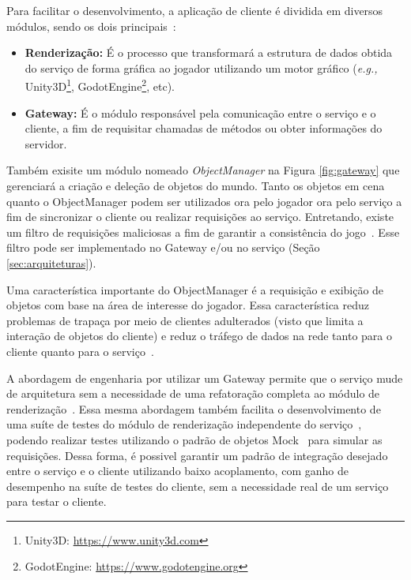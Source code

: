 Para facilitar o desenvolvimento, a aplicação de cliente é dividida em diversos módulos, sendo os dois principais~\cite{albion_online_unite}:



\begin{itemize}
  \item \textbf{Renderização:} É o processo que transformará a estrutura de dados obtida do serviço de forma gráfica ao jogador utilizando um motor gráfico (\textit{e.g.,} Unity3D\footnote{Unity3D: \url{https://www.unity3d.com}}, GodotEngine\footnote{GodotEngine: \url{https://www.godotengine.org}}, etc).
  \item \textbf{Gateway:} É o módulo responsável pela comunicação entre o serviço e o cliente, a fim de requisitar chamadas de métodos ou obter informações do servidor.
\end{itemize}



Também exisite um módulo nomeado \textit{ObjectManager} na Figura \ref{fig:gateway} que gerenciará a criação e deleção de objetos do mundo.
%
Tanto os objetos em cena quanto o ObjectManager podem ser utilizados ora pelo jogador ora pelo serviço a fim de sincronizar o cliente ou realizar requisições ao serviço.
%
Entretando, existe um filtro de requisições maliciosas a fim de garantir a consistência do jogo~\cite{albion_online_unite}.
%
Esse filtro pode ser implementado no Gateway e/ou no serviço (Seção \ref{sec:arquiteturas}).



Uma característica importante do ObjectManager é a requisição e exibição de objetos com base na área de interesse do jogador.
%
Essa característica reduz problemas de trapaça por meio de clientes adulterados (visto que limita a interação de objetos do cliente) e reduz o tráfego de dados na rede tanto para o cliente quanto para o serviço~\cite{albion_online_unite, stephenclarkewillson2017}.



A abordagem de engenharia por utilizar um Gateway permite que o serviço mude de arquitetura sem a necessidade de uma refatoração completa ao módulo de renderização~\cite{albion_online_unite, stephenclarkewillson2017}.
%
Essa mesma abordagem também facilita o desenvolvimento de uma suíte de testes do módulo de renderização independente do serviço~\cite{Freeman2009Oct}, podendo realizar testes utilizando o padrão de objetos Mock~\cite{Beck2004Nov} para simular as requisições.
%
Dessa forma, é possivel garantir um padrão de integração desejado entre o serviço e o cliente utilizando baixo acoplamento, com ganho de desempenho na suíte de testes do cliente, sem a necessidade real de um serviço para testar o cliente.



